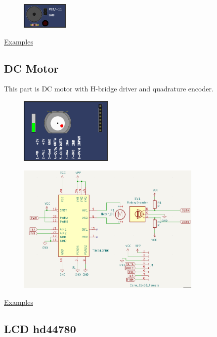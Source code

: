 \begin{figure}[H]
\center
\includegraphics[width=0.2\textwidth]{img/part_buzzer.png} 
\end{figure} 

\href{https://lcgamboa.github.io/picsimlab_examples/parts_Buzzer.html}{Examples}


\subsection{DC Motor}

This part is DC motor with H-bridge driver and quadrature encoder. 

\begin{figure}[H]
\center
\includegraphics[width=0.4\textwidth]{img/part_dcmotor.png} 
\end{figure} 

\begin{figure}[H]
\center
\includegraphics[width=0.8\textwidth]{img/part_dcmotor_.png} 
\end{figure} 

\href{https://lcgamboa.github.io/picsimlab_examples/parts_DC_Motor.html}{Examples}


\subsection{LCD hd44780}

